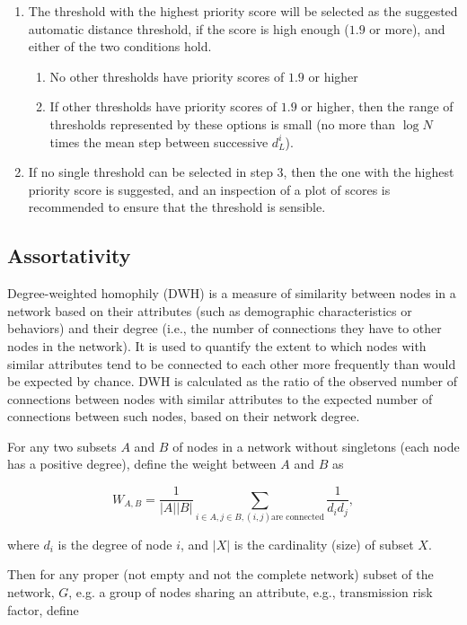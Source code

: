 \documentclass[utf8]{FrontiersinHarvard} %
\begin{document}
\begin{enumerate}
	\item{The threshold with the highest priority score will be selected as the suggested automatic distance threshold, if the score is high enough ($1.9$ or more), and either of the two conditions hold.
	            \begin{enumerate}
		            \item{No other thresholds have priority scores of $1.9$ or higher}
		            \item{If other thresholds have priority scores of $1.9$ or higher, then the range of thresholds represented by these options is small (no more than $\log N$ times the mean step between successive $d_L^i$).}
	            \end{enumerate}}

	\item{If no single threshold can be selected in step 3, then the one with the highest priority score is suggested, and an inspection of a plot of scores is recommended to ensure that the threshold is sensible.}
\end{enumerate}

\subsection{Assortativity}

Degree-weighted homophily (DWH) is a measure of similarity between nodes in a
network based on their attributes (such as demographic characteristics or
behaviors) and their degree (i.e., the number of connections they have to other
nodes in the network). It is used to quantify the extent to which nodes with
similar attributes tend to be connected to each other more frequently than
would be expected by chance\cite{RePEc:adr:anecst:y:2012:i:107-108:p:33-48}.
DWH is calculated as the ratio of the observed number of connections between
nodes with similar attributes to the expected number of connections between
such nodes, based on their network degree.

For any two subsets $A$ and $B$ of nodes in a network without singletons (each
node has a positive degree), define the weight between $A$ and $B$ as

\[
	W_{A,B} = \frac{1}{|A||B|} \sum_{i \in A, j\in B, (i,j) \text{are connected}} \frac{1}{d_i d_j},
\]

where $d_i$ is the degree of node $i$, and $|X|$ is the cardinality (size) of
subset $X$.

Then for any proper (not empty and not the complete network) subset of the
network, $G$, e.g. a group of nodes sharing an attribute, e.g., transmission
risk factor, define
\end{document}
